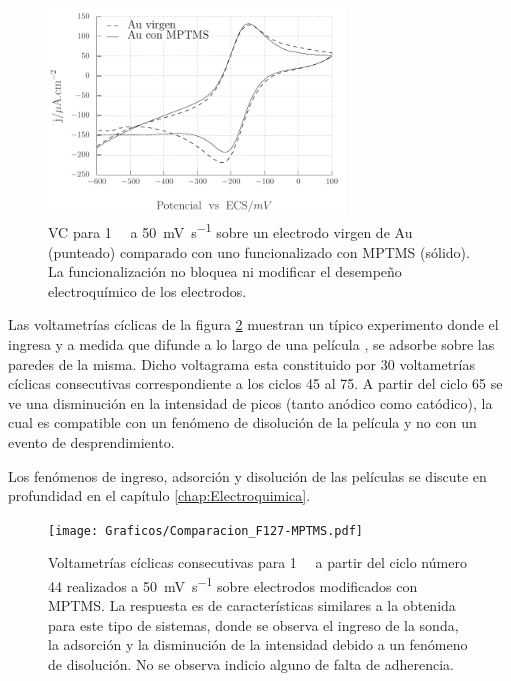 					\begin{figure}[!ht]
							\begin{center}
							\includegraphics[width=0.70\textwidth]{Graficos/Comparacion_Au-MPTMS.pdf}
							\caption[Comparación de electrodos con y sin MPTMS]{VC para \aminorutenio\space \SI{1}{\milli\Molar} a \SI{50}{\milli\volt\per\second} sobre un electrodo virgen de Au (punteado) comparado con uno funcionalizado con MPTMS (sólido). La funcionalización no bloquea ni modificar el desempeño electroquímico de los electrodos.}
							\label{fig:comparaciones_MPTMS-A}
							\end{center}
							\end{figure}

             Las voltametrías cíclicas de la figura \ref{fig:comparaciones_MPTMS-B} muestran un típico experimento donde el \aminorutenio\space ingresa y a medida que difunde a lo largo de una película \pdmF, se adsorbe sobre las paredes de la misma. Dicho voltagrama esta constituido por 30 voltametrías cíclicas consecutivas correspondiente a los ciclos 45 al 75. A partir del ciclo 65 se ve una disminución en la intensidad de picos (tanto anódico como catódico), la cual es compatible con un fenómeno de disolución de la película y no con un evento de desprendimiento. 

             Los fenómenos de ingreso, adsorción y disolución de las películas se discute en profundidad en el capítulo \ref{chap:Electroquimica}.
       	
					\begin{figure}[!ht]
							\begin{center}
				 	   	    \texttt{[image: Graficos/Comparacion\_F127-MPTMS.pdf]}
				       		\caption[Comparación de superficies con y sin MPTMS.]{Voltametrías cíclicas consecutivas para \aminorutenio\space \SI{1}{\milli\Molar} a partir del ciclo número 44 realizados a \SI{50}{\milli\volt.\second^{-1}} sobre electrodos modificados con MPTMS. La respuesta es de características similares a la obtenida para este tipo de sistemas, donde se observa el ingreso de la sonda, la adsorción y la disminución de la intensidad debido a un fenómeno de disolución. No se observa indicio alguno de falta de adherencia.}
						 \label{fig:comparaciones_MPTMS-B}	
					    \end{center}
					    \end{figure}
		
